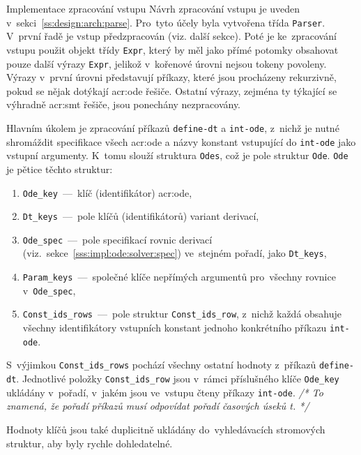 \documentclass[thesis=M,czech]{FITthesis}[2012/06/26]
\newcommand{\acrlabel}[1]{acr:#1}
\newcommand{\acr}[1]{\acrshort{\acrlabel{#1}}}
\newcommand{\cmt}[1]{\textit{/* #1 */}}
\newcommand{\id}[1]{\texttt{#1}}
\newcommand{\rf}[1]{\ref{#1}}
\begin{document}
\begin{section}{Implementace zpracování vstupu}\label{s:impl:parse}
Návrh zpracování vstupu je uveden v~sekci~\rf{ss:design:arch:parse}.
Pro~tyto účely byla vytvořena třída \id{Parser}.
V~první řadě je vstup předzpracován (viz. další sekce).
Poté je ke~zpracování vstupu použit objekt třídy \id{Expr},
který by měl jako přímé potomky obsahovat pouze další výrazy \id{Expr},
jelikož v~kořenové úrovni nejsou tokeny povoleny.
Výrazy v~první úrovni představují příkazy,
které jsou procházeny rekurzivně,
pokud se nějak dotýkají \acr{ode} řešiče.
Ostatní výrazy, zejména ty týkající se výhradně \acr{smt} řešiče,
jsou ponechány nezpracovány.

Hlavním úkolem je zpracování příkazů \id{define\--dt} a \id{int\--ode},
z~nichž je nutné shromáždit specifikace všech \acr{ode}
a názvy konstant vstupující do \id{int\--ode} jako vstupní argumenty.
K~tomu slouží struktura \id{Odes},
což je pole struktur \id{Ode}.
\id{Ode} je pětice těchto struktur:
\begin{enumerate}
\item \id{Ode\_\-key}~---~klíč (identifikátor) \acr{ode},
\item \id{Dt\_\-keys}~---~pole klíčů (identifikátorů) variant derivací,
\item \id{Ode\_\-spec}~---~pole specifikací rovnic derivací
   (viz.~sekce~\rf{sss:impl:ode:solver:spec})
   ve~stejném pořadí, jako \id{Dt\_\-keys},
\item \id{Param\_\-keys}~---~společné klíče nepřímých argumentů
   pro~všechny rovnice v~\id{Ode\_\-spec},
\item \id{Const\_\-ids\_\-rows}~---~pole struktur
   \id{Const\_\-ids\_\-row}, z~nichž každá obsahuje
   všechny identifikátory vstupních konstant
   jednoho konkrétního příkazu \id{int\--ode}.
\end{enumerate}
S~výjimkou \id{Const\_\-ids\_\-rows}
pochází všechny ostatní hodnoty
z~příkazů \id{define\--dt}.
Jednotlivé položky \id{Const\_\-ids\_\-row} jsou v~rámci
příslušného klíče \id{Ode\_\-key} ukládány v~pořadí,
v~jakém jsou ve~vstupu čteny příkazy \id{int\--ode}.
\cmt{To znamená, že pořadí příkazů musí odpovídat
pořadí časových úseků t.}

Hodnoty klíčů jsou také duplicitně ukládány
do~vyhledávacích stromových struktur,
aby byly rychle dohledatelné.


\end{section}
\end{document}
